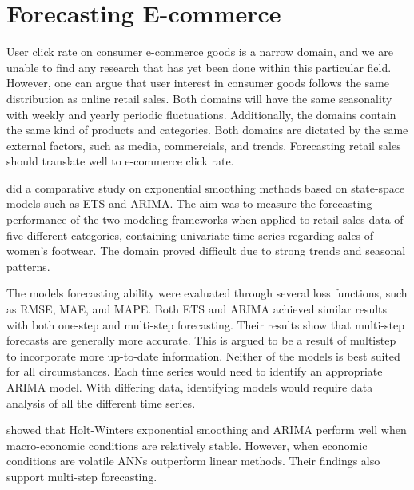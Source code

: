 \section{Forecasting E-commerce}
\label{section:RelatedWork:forecasting-ecommerce}

User click rate on consumer e-commerce goods is a narrow domain,
and we are unable to find any research that has yet been done within this particular field.
However, one can argue that user interest in consumer goods follows the same distribution
as online retail sales.
Both domains will have the same seasonality with weekly and yearly periodic fluctuations.
Additionally, the domains contain the same kind of products and categories.
Both domains are dictated by the same external factors, such as media, commercials,
and trends.
Forecasting retail sales should translate well to e-commerce click rate.


\cite{Ramos2015} did a comparative study on exponential smoothing methods
based on state-space models such as ETS and ARIMA.
The aim was to measure the forecasting performance of the two modeling frameworks
when applied to retail sales data of five different categories,
containing univariate time series regarding sales of women's footwear.
The domain proved difficult due to strong trends and seasonal patterns.

The models forecasting ability were evaluated through several loss functions, such as RMSE, MAE, and MAPE.
Both ETS and ARIMA achieved similar results with both one-step and multi-step forecasting.
Their results show that multi-step forecasts are generally more accurate.
This is argued to be a result of multistep to incorporate more up-to-date information.
Neither of the models is best suited for all circumstances.
Each time series would need to identify an appropriate ARIMA model.
With differing data, identifying models would require data analysis of all the different time series.


\cite{Chu2003} showed that Holt-Winters exponential smoothing and ARIMA perform well when macro-economic
conditions are relatively stable. However, when economic conditions are volatile
ANNs outperform linear methods.
Their findings also support multi-step forecasting.


